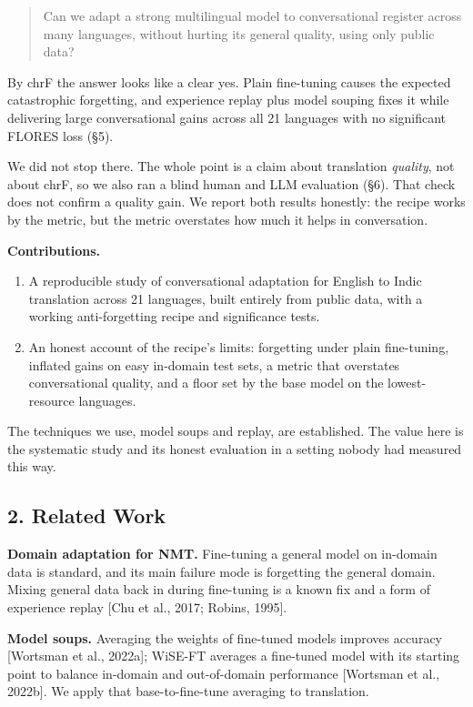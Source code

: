 \documentclass[
  11pt,
]{article}
\providecommand{\tightlist}{%
  \setlength{\itemsep}{0pt}\setlength{\parskip}{0pt}}
\begin{document}
\begin{quote}
Can we adapt a strong multilingual model to conversational register
across many languages, without hurting its general quality, using only
public data?
\end{quote}

By chrF the answer looks like a clear yes. Plain fine-tuning causes the
expected catastrophic forgetting, and experience replay plus model
souping fixes it while delivering large conversational gains across all
21 languages with no significant FLORES loss (§5).

We did not stop there. The whole point is a claim about translation
\emph{quality}, not about chrF, so we also ran a blind human and LLM
evaluation (§6). That check does not confirm a quality gain. We report
both results honestly: the recipe works by the metric, but the metric
overstates how much it helps in conversation.

\textbf{Contributions.}

\begin{enumerate}
\def\labelenumi{\arabic{enumi}.}
\tightlist
\item
  A reproducible study of conversational adaptation for English to Indic
  translation across 21 languages, built entirely from public data, with
  a working anti-forgetting recipe and significance tests.
\item
  An honest account of the recipe's limits: forgetting under plain
  fine-tuning, inflated gains on easy in-domain test sets, a metric that
  overstates conversational quality, and a floor set by the base model
  on the lowest-resource languages.
\end{enumerate}

The techniques we use, model soups and replay, are established. The
value here is the systematic study and its honest evaluation in a
setting nobody had measured this way.

\hypertarget{related-work}{%
\subsection{2. Related Work}\label{related-work}}

\textbf{Domain adaptation for NMT.} Fine-tuning a general model on
in-domain data is standard, and its main failure mode is forgetting the
general domain. Mixing general data back in during fine-tuning is a
known fix and a form of experience replay {[}Chu et al., 2017; Robins,
1995{]}.

\textbf{Model soups.} Averaging the weights of fine-tuned models
improves accuracy {[}Wortsman et al., 2022a{]}; WiSE-FT averages a
fine-tuned model with its starting point to balance in-domain and
out-of-domain performance {[}Wortsman et al., 2022b{]}. We apply that
base-to-fine-tune averaging to translation.
\end{document}
